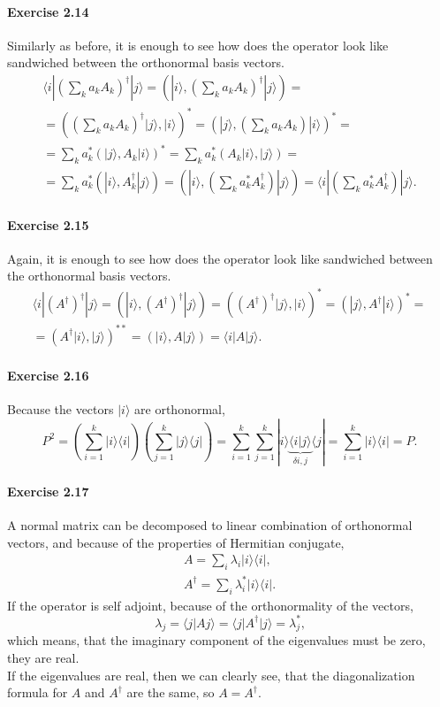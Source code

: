\documentclass[a4paper,12pt]{article}
\newcommand{\exercise}[1]{\paragraph{Exercise #1}}
\newcommand{\la}{\langle}
\newcommand{\ra}{\rangle}
\begin{document}
    \exercise{2.14} Similarly as before, it is enough to see how does the operator look like sandwiched between the orthonormal basis vectors.
    \begin{gather}
        \nonumber
        \la i | \left( \sum_k a_k A_k \right) ^ \dagger | j \ra = \left( | i \ra, \left( \sum_k a_k A_k \right) ^ \dagger | j \ra \right) = \\
        \nonumber
        = \left( \left( \sum_k a_k A_k \right) ^ \dagger | j \ra, | i \ra \right)^* = \left( | j \ra, \left( \sum_k a_k A_k \right) | i \ra \right)^* = \\
        \nonumber
        = \sum_k a_k^* \left( | j \ra, A_k | i \ra \right)^* = \sum_k a_k^* \left( A_k | i \ra, | j \ra \right) = \\
         = \sum_k a_k^* \left( | i \ra, A_k^\dagger | j \ra \right) = \left( | i \ra, \left( \sum_k a_k^* A_k^\dagger \right) | j \ra \right) = \la i | \left( \sum_k a_k^* A_k^\dagger \right) | j \ra \textrm{.}
    \end{gather}

    \exercise{2.15} Again, it is enough to see how does the operator look like sandwiched between the orthonormal basis vectors.
    \begin{gather}
        \nonumber
        \la i | (A^\dagger)^\dagger | j \ra = ( | i \ra, (A^\dagger)^\dagger | j \ra ) = ( (A^\dagger)^\dagger | j \ra, | i \ra )^* = ( | j \ra, A^\dagger | i \ra )^* = \\
        = ( A^\dagger | i \ra, | j \ra )^{**} = ( | i \ra, A | j \ra ) = \la i | A | j \ra \textrm{.}
    \end{gather}

    \exercise{2.16} Because the vectors $|i\ra$ are orthonormal,
    \begin{equation}
        P^2 = \left( \sum_{i=1}^k | i \ra \la i | \right) \left( \sum_{j=1}^k | j \ra \la j | \right) = \sum_{i=1}^k \sum_{j=1}^k | i \ra \underbrace{\la i | j \ra}_{\delta{i, j}} \la j | = \sum_{i=1}^k | i \ra \la i | = P \textrm{.}
    \end{equation}

    \exercise{2.17} A normal matrix can be decomposed to linear combination of orthonormal vectors,
    and because of the properties of Hermitian conjugate,
    \begin{gather}
        \nonumber
        A = \sum_i \lambda_i | i \ra \la i | \textrm{,} \\
        A^\dagger = \sum_i  \lambda_i^* | i \ra \la i | \textrm{.}
    \end{gather}
    If the operator is self adjoint, because of the orthonormality of the vectors,
    \begin{equation}
        \lambda_j = \la j | A j \ra = \la j | A^\dagger | j \ra = \lambda_j^* \textrm{,}
    \end{equation}
    which means, that the imaginary component of the eigenvalues must be zero, they are real. \\
    \indent
    If the eigenvalues are real, then we can clearly see, that the diagonalization formula for $A$ and $A^\dagger$ are the same, so $A = A^\dagger$.
\end{document}

